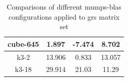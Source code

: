 \begin{table}[h!]
\begin{tabular}{|c|c|c|c|}
cube-645                                              & 1.897                                                                                                   & -7.474                                                                                               & 8.702                                                                                                   \\ \hline
k3-2                                                  & 13.906                                                                                                  & 0.833                                                                                                & 13.057                                                                                                  \\ \hline
k3-18                                                 & 29.914                                                                                                  & 21.03                                                                                                & 11.29                                                                                                   \\ \hline
\end{tabular}
\caption{Comparisons of different \gls{mumps}-\gls{blas} configurations applied to \gls{grs} matrix set}
\label{table:mumps-blas-performance-gain-grs}
\end{table}



